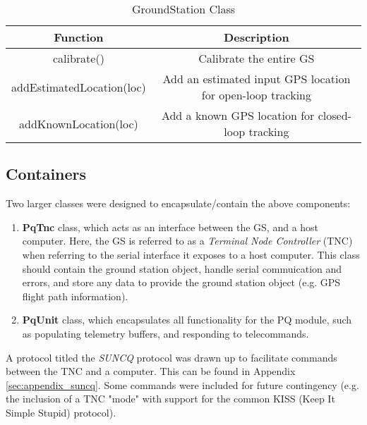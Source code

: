 \begin{table}[!htb]
  \centering
  \caption{GroundStation Class}
  \renewcommand{\arraystretch}{1.2}
  \begin{tabular}{ |c|c| }
  \hline
  \textbf{Function}             & \textbf{Description}    \\
  \hline
    calibrate()                 & Calibrate the entire GS \\
    addEstimatedLocation(loc)      & Add an estimated input GPS location for open-loop tracking \\
    addKnownLocation(loc)          & Add a known GPS location for closed-loop tracking \\
  \hline
  \end{tabular}
  \label{tab:groundStationUML}
\end{table}

\newpage

\subsection{Containers}
\noindent Two larger classes were designed to encapsulate/contain the above components:
\begin{enumerate}
  \item \textbf{PqTnc} class, which acts as an interface between the GS, and a host computer. Here, the GS is referred to as a \textit{Terminal Node Controller} (TNC) when referring to the serial interface it exposes to a host computer. This class should contain the ground station object, handle serial commuication and errors, and store any data to provide the ground station object (e.g. GPS flight path information).
  \item \textbf{PqUnit} class, which encapsulates all functionality for the PQ module, such as populating telemetry buffers, and responding to telecommands.
\end{enumerate}

\noindent A protocol titled the \textit{SUNCQ} protocol was drawn up to facilitate commands between the TNC and a computer. This can be found in Appendix \ref{sec:appendix_suncq}. Some commands were included for future contingency (e.g. the inclusion of a TNC "mode" with support for the common KISS (Keep It Simple Stupid) protocol).